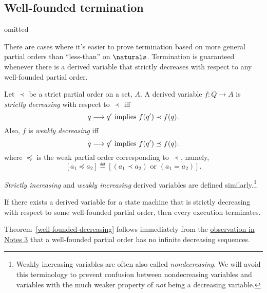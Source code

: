 \begin{editingnotes}
\section*{Well-founded termination}
omitted

\iffalse

There are cases where it's easier to prove termination based on more
general partial orders than ``less-than'' on $\naturals$.  Termination is
guaranteed whenever there is a derived variable that strictly decreases with
respect to any well-founded partial order.

\iffalse
We now define some other useful flavors of derived variables taking values
over partial ordered sets.  We'll use the notational convention that when
$\prec$ denotes a strict partial order on some set, then $\preceq$ is the
corresponding \emph{weak} partial order
\[
a\preceq a' \ \eqdef\quad a \prec a' \lor a = a'.
\]
\fi

\begin{definition}
Let $\prec$ be a strict partial order on a set, $A$.  A derived variable
$f : Q \to A$ is \emph{strictly decreasing} with respect to $\prec$ iff
\[
q \mathrel{\longrightarrow} q' \text{ implies } f(q') \prec f(q).
\]
Also, $f$ is \emph{weakly decreasing} iff
\[
q \mathrel{\longrightarrow} q' \text{  implies  } f(q') \preceq f(q).
\]
where $\preceq$ is the weak partial order corresponding to $\prec$,
namely,
\[
[a_1 \preceq a_2] \eqdef [(a_1 \prec a_2) \text{ or } (a_1=a_2)].
\]

\emph{Strictly increasing} and \emph{weakly increasing} derived variables
are defined similarly.\footnote{Weakly increasing variables are often also
called \emph{nondecreasing}.  We will avoid this terminology to prevent
confusion between nondecreasing variables and variables with the much
weaker property of \emph{not} being a decreasing variable.}
\end{definition}

\begin{theorem}\label{well-founded-decreasing}
  If there exists a derived variable for a state machine that is strictly
  decreasing with respect to some well-founded partial order, then every
  execution terminates.
\end{theorem}

Theorem~\ref{well-founded-decreasing} follows immediately from the
\href{http://courses.csail.mit.edu/6.042/spring08/ln3.pdf#infinite.decreasing}
{observation in Notes 3} that a well-founded partial order has no infinite
decreasing sequences.


\end{editingnotes}
